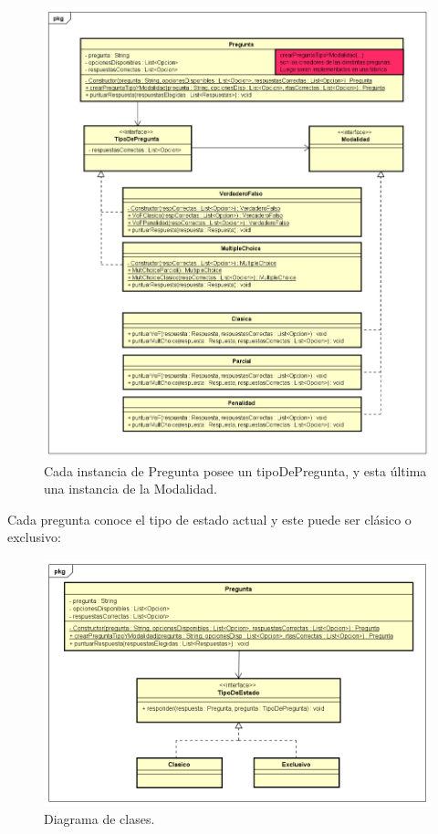 \documentclass[titlepage,a4paper]{article}
\begin{document}
\begin{figure}[H]
\centering
\includegraphics[width=1\textwidth]{img/UMLClases3.png}
\caption{\label{fig:class01}Cada instancia de Pregunta posee un tipoDePregunta, y esta última una instancia de la Modalidad.}
\end{figure}

\newpage
Cada pregunta conoce el tipo de estado actual y este puede ser clásico o exclusivo:

\begin{figure}[H]
\centering
\includegraphics[width=1\textwidth]{img/UMLClases4.png}
\caption{\label{fig:class01}Diagrama de clases.}
\end{figure}
\end{document}
